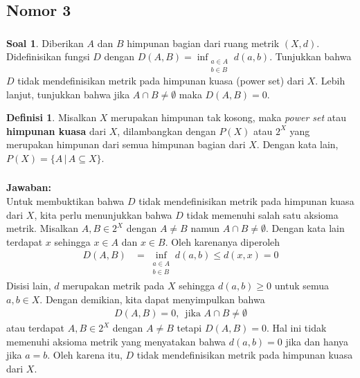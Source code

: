 \documentclass[aspectratio=169]{beamer}
\theoremstyle{definition}
\newtheorem{definisi}{Definisi}
\newtheorem{soal}{Soal}
\begin{document}
\subsection{Nomor 3}
\begin{frame}
  \frametitle{\insertsection}
  \begin{soal}
    Diberikan $A$ dan $B$ himpunan bagian dari ruang metrik $(X, d)$. Didefinisikan fungsi $D$ dengan
    $
    \displaystyle D(A, B) = \inf_{\substack{a \in A \\ b \in B}} d(a, b).
    $
    Tunjukkan bahwa $D$ tidak mendefinisikan metrik pada himpunan kuasa (power set) dari $X$. Lebih lanjut, tunjukkan bahwa jika $A \cap B \neq \emptyset$ maka $D(A, B) = 0$.
  \end{soal}
  \begin{definisi}
    Misalkan $X$ merupakan himpunan tak kosong, maka \textit{power set} atau \textbf{himpunan kuasa} dari $X$, dilambangkan dengan $P(X)$ atau $2^X$ yang merupakan himpunan dari semua himpunan bagian dari $X$. Dengan kata lain, $P(X) = \{ A\,|\,A \subseteq X \}$. 
  \end{definisi}
\end{frame}
\begin{frame}
  \frametitle{\insertsection}
  \framesubtitle{\insertsubsection}
  \textbf{Jawaban:}\\
  Untuk membuktikan bahwa $D$ tidak mendefinisikan metrik pada himpunan kuasa dari $X$, kita perlu menunjukkan bahwa $D$ tidak memenuhi salah satu aksioma metrik. Misalkan $A,B\in 2^X$ dengan $A \ne B$ namun $A\cap B \ne \emptyset$. Dengan kata lain terdapat $x$ sehingga $x \in A$ dan $x \in B$. Oleh karenanya diperoleh
  \begin{align*}
    D(A, B) &= \inf_{\substack{a \in A \\ b \in B}} d(a, b)\leq d(x, x)=0
  \end{align*}
  Disisi lain, $d$ merupakan metrik pada $X$ sehingga $d(a, b) \geq 0$ untuk semua $a,b\in X$. Dengan demikian, kita dapat menyimpulkan bahwa
  \begin{align*}
    D(A, B) = 0,\,\text{ jika } A \cap B \ne \emptyset
  \end{align*}
  atau terdapat $A,B\in 2^X$ dengan $A \ne B$ tetapi $D(A, B) = 0$. Hal ini tidak memenuhi aksioma metrik yang menyatakan bahwa $d(a, b) = 0$ jika dan hanya jika $a = b$. Oleh karena itu, $D$ tidak mendefinisikan metrik pada himpunan kuasa dari $X$.
\end{frame}
\end{document}
